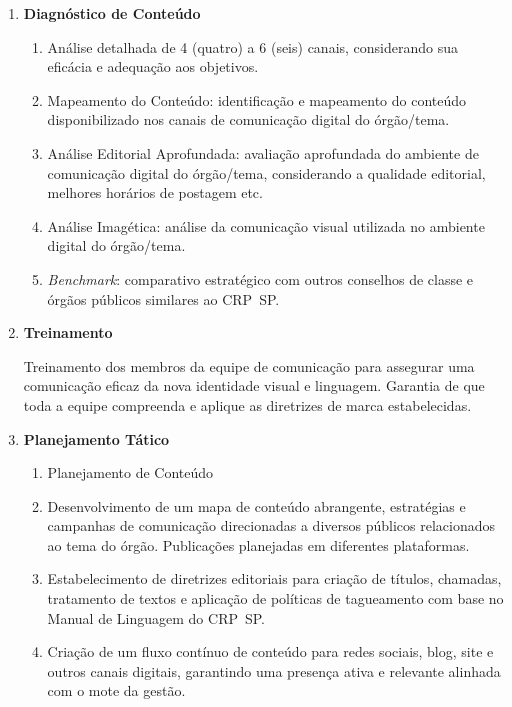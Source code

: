 \documentclass[oneside,a4paper,article]{memoir}
\begin{document}
\begin{enumerate}
\begin{enumerate}
\begin{enumerate}
					\item
	      			Benchmark: comparativo estratégico com outros conselhos de classe e órgãos públicos similares ao CRP~SP.
					\item
					Identificação e Estudo dos Públicos: mapeamento e estudo dos públicos, considerando desejos, insumos, potencialidades, fraquezas, oportunidades e ameaças.
	      	\end{enumerate}
		\end{enumerate}
	\item
		\textbf{Diagnóstico de Conteúdo}
			\begin{enumerate}
				\item
	      		Análise detalhada de 4 (quatro) a 6 (seis) canais, considerando sua    eficácia e adequação aos objetivos.
				\item
	      		Mapeamento do Conteúdo: identificação e mapeamento do conteúdo disponibilizado nos canais de comunicação digital do órgão/tema.
				\item
	      		Análise Editorial Aprofundada: avaliação aprofundada do ambiente de comunicação digital do órgão/tema, considerando a qualidade editorial, melhores horários de postagem etc.
				\item
	      		Análise Imagética: análise da comunicação visual utilizada no ambiente digital do órgão/tema.
				\item
	      		\textit{Benchmark}: comparativo estratégico com outros conselhos de classe e órgãos públicos similares ao CRP~SP.
			\end{enumerate}
    \item
 \textbf{Treinamento}

		Treinamento dos membros da equipe de comunicação para assegurar uma comunicação eficaz da nova identidade visual e linguagem. Garantia de que toda a equipe compreenda e aplique as diretrizes de marca estabelecidas.
	\item
	    \textbf{Planejamento Tático}
			\begin{enumerate}
				\item
	      		Planejamento de Conteúdo
				\item
	      		Desenvolvimento de um mapa de conteúdo abrangente, estratégias e campanhas de comunicação direcionadas a diversos públicos relacionados ao tema do órgão. Publicações planejadas em diferentes plataformas.
				\item
	      		Estabelecimento de diretrizes editoriais para criação de títulos, chamadas, tratamento de textos e aplicação de políticas de tagueamento com base no Manual de Linguagem do CRP~SP.
				\item
	      		Criação de um fluxo contínuo de conteúdo para redes sociais, blog, site e outros canais digitais, garantindo uma presença ativa e relevante alinhada com o mote da gestão.
			\end{enumerate}


\end{enumerate}
\end{document}
